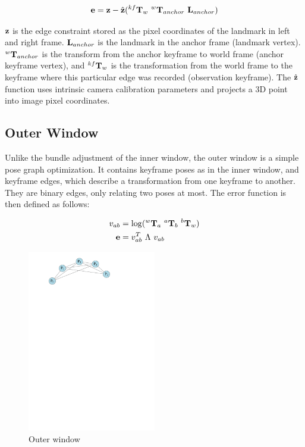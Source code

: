 \begin{align}
 \mathbf e = \mathbf z - \hat{\mathbf z}( ^{kf}\mathbf T_w \ ^w \mathbf T_{anchor} \ \mathbf L_{anchor})
\end{align}

$\mathbf z$ is the edge constraint stored as the pixel coordinates of the landmark in left and right frame. $\mathbf L_{anchor}$ is the landmark in the anchor frame (landmark vertex).  $^w \mathbf T_{anchor}$ is the transform from the anchor keyframe to world frame (anchor keyframe vertex), and $^{kf}\mathbf T_w$ is the transformation from the world frame to the keyframe where this particular edge was recorded (observation keyframe).  The $\hat{\mathbf z}$ function uses intrinsic camera calibration parameters and projects a 3D point into image pixel coordinates.

\subsection{Outer Window}

Unlike the bundle adjustment of the inner window, the outer window is a simple pose graph optimization.  It contains keyframe poses as in the inner window, and keyframe edges, which describe a transformation from one keyframe to another.  They are binary edges, only relating two poses at most.  The error function is then defined as follows:

\begin{align}
 v_{ab} &=  \log(^{w}\mathbf T_{a} \ ^{a} \mathbf T_{b} \ ^{b} \mathbf T_{w}) \\
 \mathbf e &= v_{ab}^T \ \Lambda \ v_{ab}
\end{align}

\begin{figure}[h!]
  \centering
    \includegraphics[width=0.5\textwidth]{chapters/images/outer_window}
  \caption{Outer window}
  \label{fig:outer_window}
\end{figure}

